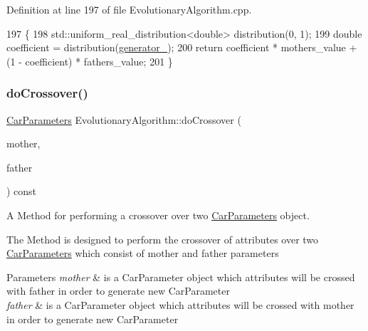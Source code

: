 Definition at line 197 of file Evolutionary\+Algorithm.\+cpp.


\begin{DoxyCode}
197                                                                                           \{
198     std::uniform\_real\_distribution<double> distribution(0, 1);
199     \textcolor{keywordtype}{double} coefficient = distribution(\hyperlink{classEvolutionaryAlgorithm_adbd823d385ad95bf20496fd2fc25ccde}{generator\_});
200     \textcolor{keywordflow}{return} coefficient * mothers\_value + (1 - coefficient) * fathers\_value;
201 \}
\end{DoxyCode}
\mbox{\label{classEvolutionaryAlgorithm_a387fba63cd849a74652c6de1beb82318}} 
\subsubsection{\texorpdfstring{do\+Crossover()}{doCrossover()}\hspace{0.1cm}{\footnotesize\ttfamily [2/2]}}
{\footnotesize\ttfamily \hyperlink{classCarParameters}{Car\+Parameters} Evolutionary\+Algorithm\+::do\+Crossover (\begin{DoxyParamCaption}\item[{const \hyperlink{classCarParameters}{Car\+Parameters} \&}]{mother,  }\item[{const \hyperlink{classCarParameters}{Car\+Parameters} \&}]{father }\end{DoxyParamCaption}) const\hspace{0.3cm}{\ttfamily [private]}}



A Method for performing a crossover over two \hyperlink{classCarParameters}{Car\+Parameters} object. 

The Method is designed to perform the crossover of attributes over two \hyperlink{classCarParameters}{Car\+Parameters} which consist of mother and father parameters 
\begin{DoxyParams}{Parameters}
{\em mother} & is a Car\+Parameter object which attributes will be crossed with father in order to generate new Car\+Parameter \\
\hline
{\em father} & is a Car\+Parameter object which attributes will be crossed with mother in order to generate new Car\+Parameter \\
\hline
\end{DoxyParams}


